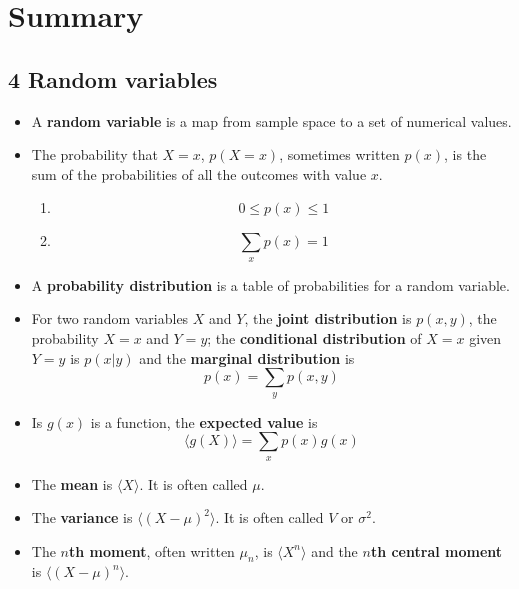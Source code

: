 
\ifind
\section*{Summary}
\else
\subsection*{4 Random variables}
\fi


\begin{itemize}
\item A \textbf{random variable} is a map from sample space to a set of numerical values.
\item The probability that $X=x$, $p(X=x)$, sometimes written $p(x)$,
  is the sum of the probabilities of all the outcomes with value $x$.
  \begin{enumerate}
    \item \begin{equation}
0\le p(x)\le 1
\end{equation}
\item 
\begin{equation}
\sum_x{p(x)}=1
\end{equation}
\end{enumerate}

\item A \textbf{probability distribution} is a table of probabilities for a random variable.

\item For two random variables $X$ and $Y$, the \textbf{joint distribution} is $p(x,y)$, the probability $X=x$ and $Y=y$; the \textbf{conditional distribution} of $X=x$ given $Y=y$ is $p(x|y)$ and the \textbf{marginal distribution} is
  \begin{equation}
    p(x)=\sum_{y}p(x,y)
  \end{equation}

\item Is $g(x)$ is a function, the \textbf{expected value} is
  \begin{equation}
\langle g(X)\rangle = \sum_x p(x)g(x)
  \end{equation}

\item The \textbf{mean} is $\langle X\rangle$. It is often called $\mu$.

\item The \textbf{variance} is $\langle (X-\mu)^2\rangle$. It is often called $V$ or $\sigma^2$.

\item The \textbf{$n$th moment}, often written $\mu_n$, is $\langle X^n\rangle$ and the \textbf{$n$th central moment} is $\langle (X-\mu)^n\rangle$.


\end{itemize}
